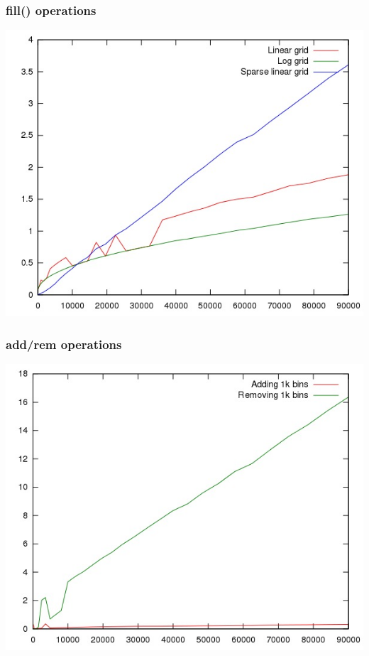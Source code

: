 \documentclass{beamer}
\begin{document}
  \begin{frame}
      \frametitle{fill() operations}
      \includegraphics[height=0.89\textheight]{1.jpg}
  \end{frame}

  \begin{frame}
    \frametitle{add/rem operations}
    \includegraphics[height=0.89\textheight]{2.jpg}
  \end{frame}
\end{document}
